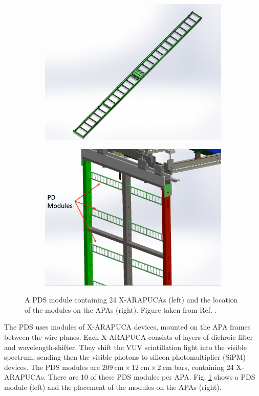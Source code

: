 \begin{figure}[h!]
	\begin{subfigure}{0.49\textwidth}
		\centering
		\includegraphics[width=.90\linewidth]{Images/DUNE/FD/pds-module}
	\end{subfigure}
	\begin{subfigure}{0.49\textwidth}
		\centering
		\includegraphics[width=.90\linewidth]{Images/DUNE/FD/pds-in-apa-assembly}
	\end{subfigure}
	\caption[A PDS module containing 24 X-ARAPUCAs and the location of the modules on the APAs.]{A PDS module containing 24 X-ARAPUCAs (left) and the location of the modules on the APAs (right). Figure taken from Ref. \cite{DUNE2020TDR1}.}
	\label{fig:dune_pds}
\end{figure}

The PDS uses modules of X-ARAPUCA devices, mounted on the APA frames between the wire planes. Each X-ARAPUCA consists of layers of dichroic filter and wavelength-shifter. They shift the VUV scintillation light into the visible spectrum, sending then the visible photons to silicon photomultiplier (SiPM) devices. The PDS modules are $209~\mathrm{cm}\times12~\mathrm{cm}\times2~\mathrm{cm}$ bars, containing 24 X-ARAPUCAs. There are 10 of these PDS modules per APA. Fig. \ref{fig:dune_pds} shows a PDS module (left) and the placement of the modules on the APAs (right).


